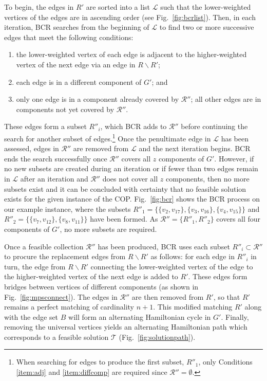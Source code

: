 \documentclass{IEEEtran}
\begin{document}
To begin, the edges in $R'$ are sorted into a list $\mathcal{L}$ such that the lower-weighted vertices of the edges are in ascending order (see Fig.~\ref{fig:bcrlist}). Then, in each iteration, BCR searches from the beginning of $\mathcal{L}$ to find two or more successive edges that meet the following conditions:
\begin{enumerate}[label={(\roman*)}]
	\item the lower-weighted vertex of each edge is adjacent to the higher-weighted vertex of the next edge via an edge in $R\backslash R'$;\label{item:adj}
	\item each edge is in a different component of $G'$; \label{item:diffcomp} and
	\item only one edge is in a component already covered by $\mathcal{R}''$; all other edges are in components not yet covered by $\mathcal{R}''$.\label{item:overlap}
\end{enumerate} 
These edges form a subset $R''_i$, which BCR adds to $\mathcal{R}''$ before continuing the search for another subset of edges.\footnote{When searching for edges to produce the first subset, $R''_1$, only Conditions \ref{item:adj} and \ref{item:diffcomp} are required since $\mathcal{R}'' = \emptyset$.} Once the penultimate edge in $\mathcal{L}$ has been assessed, edges in $\mathcal{R}''$ are removed from $\mathcal{L}$ and the next iteration begins. BCR ends the search successfully once $\mathcal{R}''$ covers all $z$ components of $G'$. However, if no new subsets are created during an iteration or if fewer than two edges remain in $\mathcal{L}$ after an iteration and $\mathcal{R}''$ does not cover all $z$ components, then no more subsets exist and it can be concluded with certainty that no feasible solution exists for the given instance of the COP. Fig.~\ref{fig:bcr} shows the BCR process on our example instance, where the subsets $R''_1 = \{\{v_2, v_{17}\},\{v_3, v_{16}\}, \{v_4, v_{15}\}\}$ and $R''_2 = \{\{v_7, v_{12}\}, \{v_8, v_{11}\}\}$ have been formed. As $\mathcal{R}'' =\{R''_1, R''_2\}$ covers all four components of $G'$, no more subsets are required.

Once a feasible collection $\mathcal{R}''$ has been produced, BCR uses each subset $R''_i \subset \mathcal{R}''$ to procure the replacement edges from $R\backslash R'$ as follows: for each edge in $R''_i$ in turn, the edge from $R \backslash R'$ connecting the lower-weighted vertex of the edge to the higher-weighted vertex of the next edge is added to $R'$. These edges form bridges between vertices of different components (as shown in Fig.~\ref{fig:mpsconnect}). The edges in $\mathcal{R}''$ are then removed from $R'$, so that $R'$ remains a perfect matching of cardinality $n+1$. This modified matching $R'$ along with the edge set $B$ will form an alternating Hamiltonian cycle in $G'$. Finally, removing the universal vertices yields an alternating Hamiltonian path which corresponds to a feasible solution $\mathcal{T}$ (Fig.~\ref{fig:solutionpath}).
\end{document}
